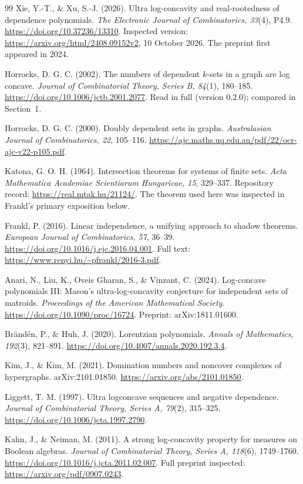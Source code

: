 \documentclass[11pt,a4paper]{article}
\theoremstyle{remark}
\begin{document}
\begingroup\small
\begin{thebibliography}{99}
Xie, Y.-T., \& Xu, S.-J. (2026). Ultra log-concavity and real-rootedness of dependence polynomials. \emph{The Electronic Journal of Combinatorics, 33}(4), P4.9. \url{https://doi.org/10.37236/13310}. Inspected version: \url{https://arxiv.org/html/2408.09152v2}, 10 October 2026. The preprint first appeared in 2024.

Horrocks, D. G. C. (2002). The numbers of dependent $k$-sets in a graph are log concave. \emph{Journal of Combinatorial Theory, Series B, 84}(1), 180--185. \url{https://doi.org/10.1006/jctb.2001.2077}. Read in full (version 0.2.0); compared in Section~1.

Horrocks, D. G. C. (2000). Doubly dependent sets in graphs. \emph{Australasian Journal of Combinatorics, 22}, 105--116. \url{https://ajc.maths.uq.edu.au/pdf/22/ocr-ajc-v22-p105.pdf}.

Katona, G. O. H. (1964). Intersection theorems for systems of finite sets. \emph{Acta Mathematica Academiae Scientiarum Hungaricae, 15}, 329--337. Repository record: \url{https://real.mtak.hu/21124/}. The theorem used here was inspected in Frankl's primary exposition below.

Frankl, P. (2016). Linear independence, a unifying approach to shadow theorems. \emph{European Journal of Combinatorics, 57}, 36--39. \url{https://doi.org/10.1016/j.ejc.2016.04.001}. Full text: \url{https://www.renyi.hu/~pfrankl/2016-3.pdf}.

Anari, N., Liu, K., Oveis Gharan, S., \& Vinzant, C. (2024). Log-concave polynomials III: Mason's ultra-log-concavity conjecture for independent sets of matroids. \emph{Proceedings of the American Mathematical Society}. \url{https://doi.org/10.1090/proc/16724}. Preprint: arXiv:1811.01600.

Br\"and\'en, P., \& Huh, J. (2020). Lorentzian polynomials. \emph{Annals of Mathematics, 192}(3), 821--891. \url{https://doi.org/10.4007/annals.2020.192.3.4}.

Kim, J., \& Kim, M. (2021). Domination numbers and noncover complexes of hypergraphs. arXiv:2101.01850. \url{https://arxiv.org/abs/2101.01850}.

Liggett, T. M. (1997). Ultra logconcave sequences and negative dependence. \emph{Journal of Combinatorial Theory, Series A, 79}(2), 315--325. \url{https://doi.org/10.1006/jcta.1997.2790}.

Kahn, J., \& Neiman, M. (2011). A strong log-concavity property for measures on Boolean algebras. \emph{Journal of Combinatorial Theory, Series A, 118}(6), 1749--1760. \url{https://doi.org/10.1016/j.jcta.2011.02.007}. Full preprint inspected: \url{https://arxiv.org/pdf/0907.0243}.
\end{thebibliography}
\endgroup
\end{document}
